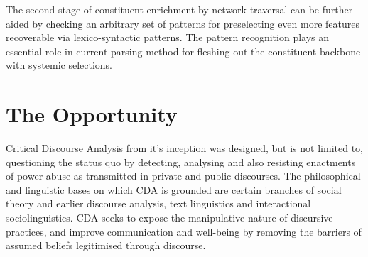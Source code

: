 The second stage of constituent enrichment by network traversal can be further aided by checking an arbitrary set of patterns for preselecting even more features recoverable via lexico-syntactic patterns.
The pattern recognition plays an essential role in current parsing method for fleshing out the constituent backbone with systemic selections.

\section{The Opportunity}
\label{sec:opportunity}

Critical Discourse Analysis from it's inception was designed, but is not limited to, questioning the status quo by detecting, analysing and also resisting enactments of power abuse as transmitted in private and public discourses. The philosophical and linguistic bases on which CDA is grounded are certain branches of social theory and earlier discourse analysis, text linguistics and interactional sociolinguistics. CDA seeks to expose the manipulative nature of discursive practices, and improve communication and well-being by removing the barriers of assumed beliefs legitimised through discourse\citep{Tenorio2011}. 

